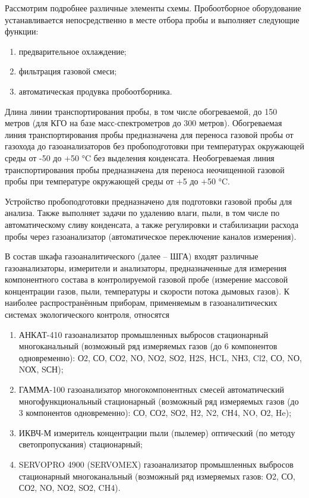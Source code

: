 \documentclass[14pt, a4paper]{extreport}
\begin{document}
	Рассмотрим подробнее различные элементы схемы. Пробоотборное оборудование устанавливается непосредственно в месте отбора пробы и выполняет следующие функции:
	\begin{enumerate}[label={\arabic*)}]
		\item предварительное охлаждение;
		\item фильтрация газовой смеси;
		\item автоматическая продувка пробоотборника.
	\end{enumerate}

	Длина линии транспортирования пробы, в том числе обогреваемой, до 150 метров (для КГО на базе масс-спектрометров до 300 метров). Обогреваемая линия транспортирования пробы предназначена для переноса газовой пробы от газохода до газоанализаторов без пробоподготовки при температурах окружающей среды от -50 до +50 °C без выделения конденсата. Необогреваемая линия транспортирования пробы предназначена для переноса неочищенной газовой пробы при температуре окружающей среды от +5 до +50 °C.
	
	Устройство пробоподготовки предназначено для подготовки газовой пробы для анализа. Также выполняет задачи по удалению влаги, пыли, в том числе по автоматическому сливу конденсата, а также регулировки и стабилизации расхода пробы через газоанализатор (автоматическое переключение каналов измерения).
	
	В состав шкафа газоаналитического (далее -- ШГА) входят различные газоанализаторы, измерители и анализаторы, предназначенные для измерения компонентного состава в контролируемой газовой пробе (измерение массовой концентрации газов, пыли, температуры и скорости потока дымовых газов). К наиболее распространённым приборам, применяемым в газоаналитических системах экологического контроля, относятся
	\begin{enumerate}[label={\arabic*)}]
		\item АНКАТ-410 газоанализатор промышленных выбросов стационарный многоканальный (возможный ряд измеряемых газов (до 6 компонентов одновременно): О2, СО, СО2, NО, NО2, SО2, H2S, НCL, NН3, Cl2, СО, NО, NОХ, SСН);
		\item ГАММА-100 газоанализатор многокомпонентных смесей автоматический многофункциональный стационарный (возможный ряд измеряемых газов (до 3 компонентов одновременно): СО, СО2, SО2, H2, N2, CН4, NO, О2, He);
		\item ИКВЧ-М измеритель концентрации пыли (пылемер) оптический (по методу светопропускания) стационарный;
		\item SERVOPRO 4900 (SERVOMEX) газоанализатор промышленных выбросов стационарный многоканальный (возможный ряд измеряемых газов: О2, СО, СО2, NО, NО2, SО2, CH4).
	\end{enumerate}
\end{document}
